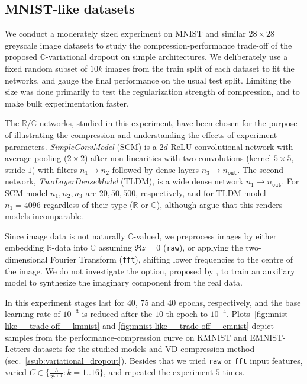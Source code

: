 \documentclass[a4paper,10pt]{article}
\newcommand{\real}{\mathbb{R}}
\newcommand{\cplx}{\mathbb{C}}
\begin{document}


\subsection{MNIST-like datasets} %
\label{sub:mnist_like_datasets}

We conduct a moderately sized experiment on MNIST and similar $28\times 28$ greyscale image
datasets to study the compression-performance trade-off of the proposed $\cplx$-variational
dropout on simple architectures.
We deliberately use a {fixed} random subset of $10k$ images from the train split of each
dataset to fit the networks, and gauge the final performance on the usual test split.
Limiting the size was done primarily to test the regularization strength of compression,
and to make bulk experimentation faster.

The $\real$/$\cplx$ networks, studied in this experiment, have been chosen for the purpose 
of illustrating the compression and understanding the effects of experiment parameters.
\textit{SimpleConvModel} (SCM) is a $2d$ ReLU convolutional network with average pooling
($2\times 2$) after non-linearities with two convolutions (kernel $5\times 5$, stride $1$)
with filters $n_1 \to n_2$ followed by dense layers $n_3 \to n_\mathtt{out}$. The second
network, \textit{TwoLayerDenseModel} (TLDM), is a wide dense network $n_1 \to n_\mathtt{out}$.
For SCM model $n_1, n_2, n_3$ are $20, 50, 500$, respectively, and for TLDM model $
  n_1 = 4096
$ regardless of their type ($\real$ or $\cplx$), although \citet{monning_evaluation_2018}
argue that this renders models incomparable.

Since image data is not naturally $\cplx$-valued, we preprocess images by either embedding
$\real$-data into $\cplx$ assuming $\Re z = 0$ (\texttt{raw}), or applying the two-dimensional
Fourier Transform (\texttt{fft}), shifting lower frequencies to the centre of the image. We
do not investigate the option, proposed by \citet{trabelsi_deep_2017}, to train an auxiliary
model to synthesize the imaginary component from the real data.

In this experiment stages last for $40$, $75$ and $40$ epochs, respectively, and the base
learning rate of ${10}^{-3}$ is reduced after the $10$-th epoch to ${10}^{-4}$.
%
Plots~\ref{fig:mnist-like__trade-off__kmnist} and \ref{fig:mnist-like__trade-off__emnist}
depict samples from the performance-compression curve on KMNIST and EMNIST-Letters datasets
for the studied models and VD compression method (sec.~\ref{ssub:variational_dropout}).
Besides that we tried \texttt{raw} or \texttt{fft} input features, varied $
  C \in \{\tfrac3{2^{k+1}}\colon k=1..16\}
$, and repeated the experiment $5$ times.
\end{document}
